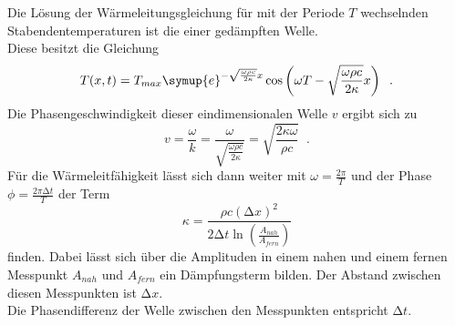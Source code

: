 \noindent Die Lösung der Wärmeleitungsgleichung für mit der Periode $T$ wechselnden Stabendentemperaturen ist die einer gedämpften Welle.\\
Diese besitzt die Gleichung
\begin{equation*}
    T(x,t)=T_{max} \symup{e}^{-\sqrt{\frac{\omega \rho c}{2 \kappa}}x} \cos\left( \omega T- \sqrt{\frac{\omega \rho c}{2 \kappa}} x \right) \; \; .
\end{equation*}
Die Phasengeschwindigkeit dieser eindimensionalen Welle $v$ ergibt sich zu
\begin{equation*}
    v= \frac{\omega}{k}= \frac{\omega}{\sqrt{\frac{\omega \rho c}{2 \kappa}}}=\sqrt{\frac{2 \kappa \omega}{\rho c}} \; \; . 
\end{equation*}
Für die Wärmeleitfähigkeit lässt sich dann weiter mit $\omega = \frac{2 \pi}{T}$ und der Phase $\phi=\frac{2 \pi \increment t}{T}$ der Term 
\begin{equation*} 
    \kappa =\frac{\rho c(\increment x)^2}{2 \increment t \ln{\left(\frac{A_{nah}}{A_{fern}}\right)}}
\end{equation*}
finden. Dabei lässt sich über die Amplituden in einem nahen und einem fernen Messpunkt $A_{nah}$ und $A_{fern}$ ein Dämpfungsterm bilden.
Der Abstand zwischen diesen Messpunkten ist $\increment x$.\\
Die Phasendifferenz der Welle zwischen den Messpunkten entspricht $\increment t$.